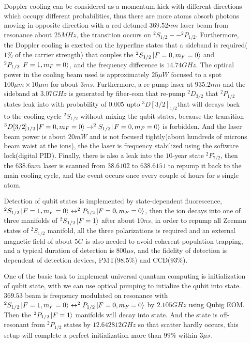 Doppler cooling can be considered as a momentum kick with different directions which occupy different probabilities, thus there are more atoms absorb photons moving in opposite direction with a red detuned $369.52\unit{nm}$ laser beam from resonance about $25\unit{MHz}$, the transition occurs on $^2S_{1/2}--^2P_{1/2}$. Furthermore, the Doppler cooling is exerted on the hyperfine states that a sideband is required($1\%$ of the carrier strength) that couples the $^2S_{1/2}\ket{F=0,m_F=0}$ and $^2P_{1/2}\ket{F=1,m_F=0}$, and the frequency difference is $14.74\unit{GHz}$. The optical power in the cooling beam used is approximately $25\unit{\mu W}$ focused to a spot $100\unit{\mu m}\times 10\unit{\mu m}$ for about $3\unit{ms}$. Furthermore, a re-pump laser at $935.2\unit{nm}$ and the sideband at $3.07\unit{GHz}$ is generated by fiber-eom that re-pump $^2D_{3/2}$ that $^2P_{1/2}$ states leak into with probability of $0.005$ upto $^3D[3/2]_{1/2}$that will decays back to the cooling cycle $^2S_{1/2}$ without mixing the qubit states, because the transition $^3D[3/2]_{1/2}\ket{F=0,m_F=0}\rightarrow^2S_{1/2}\ket{F=0,m_F=0}$ is forbidden. And the laser beam power is about $20\unit{mW}$ and is not focused tightly(about hundreds of microns beam waist at the ions), the the laser is frequency stabilized using the software lock(digital PID). Finally, there is also a leak into the $10$-year state $^2F_{7/2}$, then the $638.6\unit{nm}$ laser is scanned from $38.6102$ to $638.6151$ to repump it back to the main cooling cycle, and the event occurs once every couple of hours for s single atom.

Detection of qubit states is implemented by state-dependent fluorescence, $^2S_{1/2}\ket{F=1,m_F=0}\leftrightarrow ^2P_{1/2}\ket{F=0,m_F=0}$, then the ion decays into one of three manifolds of $^2S_{1/2}\ket{F=1}$ after about $10\unit{ns}$, in order to repump all Zeeman states of $^2S_{1/2}$ manifold, all the three polarizations is required and an external magnetic field of about $5\unit{G}$ is also needed to avoid coherent population trapping, and a typical duration of detection is $800\unit{\mu s}$, and the fidelity of detection is dependent of detection devices, PMT($98.5\%$) and CCD($93\%$).

One of the basic task to implement universal quantum computing is initialization of qubit state, with  we can use optical pumping to intialize the qubit into \dark state. $369.53$ beam is frequency modulated on resonance with $\mbox{$^2S_{1/2}\ket{F=1,m_F=0}$}\leftrightarrow ^2P_{1/2}\ket{F=0,m_F=0}$ by $2.105\unit{GHz}$ using Qubig EOM. Then the $^2P_{1/2}\ket{F=1}$ manifolds will decay into \dark state. And the \dark state is off-resonant from $^2P_{1/2}$ states by $12.642812\unit{GHz}$ so that scatter hardly occurs, this setup will complete a perfect initialization more than $99\%$ within $3\unit{\mu s}$.

